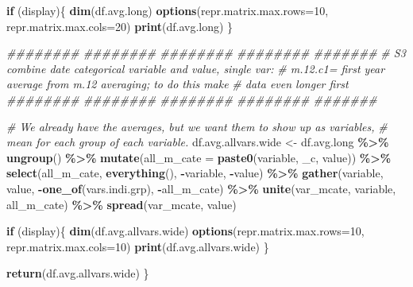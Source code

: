 \documentclass[
]{book}
\newenvironment{Shaded}{\begin{snugshade}}{\end{snugshade}}
\newcommand{\CommentTok}[1]{\textcolor[rgb]{0.56,0.35,0.01}{\textit{#1}}}
\newcommand{\ControlFlowTok}[1]{\textcolor[rgb]{0.13,0.29,0.53}{\textbf{#1}}}
\newcommand{\DataTypeTok}[1]{\textcolor[rgb]{0.13,0.29,0.53}{#1}}
\newcommand{\DecValTok}[1]{\textcolor[rgb]{0.00,0.00,0.81}{#1}}
\newcommand{\KeywordTok}[1]{\textcolor[rgb]{0.13,0.29,0.53}{\textbf{#1}}}
\newcommand{\NormalTok}[1]{#1}
\newcommand{\OperatorTok}[1]{\textcolor[rgb]{0.81,0.36,0.00}{\textbf{#1}}}
\newcommand{\StringTok}[1]{\textcolor[rgb]{0.31,0.60,0.02}{#1}}
\begin{document}
\begin{Shaded}
\begin{Highlighting}[]
\ControlFlowTok{if}\NormalTok{ (display)\{}
  \KeywordTok{dim}\NormalTok{(df.avg.long)}
  \KeywordTok{options}\NormalTok{(}\DataTypeTok{repr.matrix.max.rows=}\DecValTok{10}\NormalTok{, }\DataTypeTok{repr.matrix.max.cols=}\DecValTok{20}\NormalTok{)}
  \KeywordTok{print}\NormalTok{(df.avg.long)}
\NormalTok{\}}

\CommentTok{\#\#\#\#\#\#\#\# \#\#\#\#\#\#\#\# \#\#\#\#\#\#\#\# \#\#\#\#\#\#\#\# \#\#\#\#\#\#\#}
\CommentTok{\# S3 combine date categorical variable and value, single var:}
\CommentTok{\# m.12.c1= first year average from m.12 averaging; to do this make }
\CommentTok{\# data even longer first}
\CommentTok{\#\#\#\#\#\#\#\# \#\#\#\#\#\#\#\# \#\#\#\#\#\#\#\# \#\#\#\#\#\#\#\# \#\#\#\#\#\#\#}

\CommentTok{\# We already have the averages, but we want them to show up as variables,}
    \CommentTok{\# mean for each group of each variable.}
\NormalTok{df.avg.allvars.wide \textless{}{-}}\StringTok{ }\NormalTok{df.avg.long }\OperatorTok{\%\textgreater{}\%}
\StringTok{   }\KeywordTok{ungroup}\NormalTok{() }\OperatorTok{\%\textgreater{}\%}
\StringTok{   }\KeywordTok{mutate}\NormalTok{(}\DataTypeTok{all\_m\_cate =} \KeywordTok{paste0}\NormalTok{(variable, }\StringTok{\textquotesingle{}\_c\textquotesingle{}}\NormalTok{, value)) }\OperatorTok{\%\textgreater{}\%}
\StringTok{   }\KeywordTok{select}\NormalTok{(all\_m\_cate, }\KeywordTok{everything}\NormalTok{(), }\OperatorTok{{-}}\NormalTok{variable, }\OperatorTok{{-}}\NormalTok{value) }\OperatorTok{\%\textgreater{}\%}
\StringTok{   }\KeywordTok{gather}\NormalTok{(variable, value, }\OperatorTok{{-}}\KeywordTok{one\_of}\NormalTok{(vars.indi.grp), }\OperatorTok{{-}}\NormalTok{all\_m\_cate) }\OperatorTok{\%\textgreater{}\%}
\StringTok{   }\KeywordTok{unite}\NormalTok{(}\StringTok{\textquotesingle{}var\_mcate\textquotesingle{}}\NormalTok{, variable, all\_m\_cate) }\OperatorTok{\%\textgreater{}\%}
\StringTok{   }\KeywordTok{spread}\NormalTok{(var\_mcate, value)}

\ControlFlowTok{if}\NormalTok{ (display)\{}
  \KeywordTok{dim}\NormalTok{(df.avg.allvars.wide)}
  \KeywordTok{options}\NormalTok{(}\DataTypeTok{repr.matrix.max.rows=}\DecValTok{10}\NormalTok{, }\DataTypeTok{repr.matrix.max.cols=}\DecValTok{10}\NormalTok{)}
  \KeywordTok{print}\NormalTok{(df.avg.allvars.wide)}
\NormalTok{\}}

\KeywordTok{return}\NormalTok{(df.avg.allvars.wide)}
\NormalTok{\}}
\end{Highlighting}
\end{Shaded}
\end{document}
